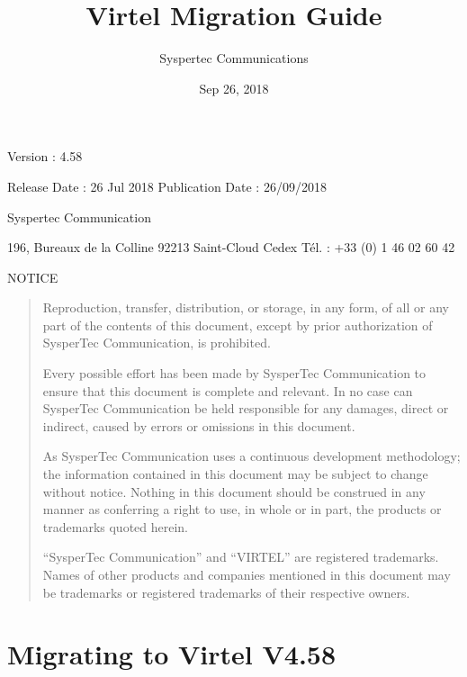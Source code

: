 \documentclass[letterpaper,10pt,english]{sphinxmanual}
\title{Virtel Migration Guide}
\date{Sep 26, 2018}
\author{Syspertec Communications}
\begin{document}
\maketitle
\sphinxtableofcontents
{}\label{\detokenize{Migration_Guide::doc}}



Version : 4.58

Release Date : 26 Jul 2018 Publication Date : 26/09/2018

Syspertec Communication

196, Bureaux de la Colline 92213 Saint-Cloud Cedex Tél. : +33 (0) 1 46 02 60 42


NOTICE
\begin{quote}

Reproduction, transfer, distribution, or storage, in any form, of all or any part of
the contents of this document, except by prior authorization of SysperTec
Communication, is prohibited.

Every possible effort has been made by SysperTec Communication to ensure that this document
is complete and relevant. In no case can SysperTec Communication be held responsible for
any damages, direct or indirect, caused by errors or omissions in this document.

As SysperTec Communication uses a continuous development methodology; the information
contained in this document may be subject to change without notice. Nothing in this
document should be construed in any manner as conferring a right to use, in whole or in
part, the products or trademarks quoted herein.

“SysperTec Communication” and “VIRTEL” are registered trademarks. Names of other products
and companies mentioned in this document may be trademarks or registered trademarks of
their respective owners.
\end{quote}

\newpage


\chapter{Migrating to Virtel V4.58}
\label{\detokenize{Migration_Guide:virtel458mi}}\label{\detokenize{Migration_Guide:migration-guide-v4-58}}\label{\detokenize{Migration_Guide:index-0}}\label{\detokenize{Migration_Guide:migrating-to-virtel-v4-58}}\label{\detokenize{Migration_Guide:v458mi-introduction}}
\end{document}
